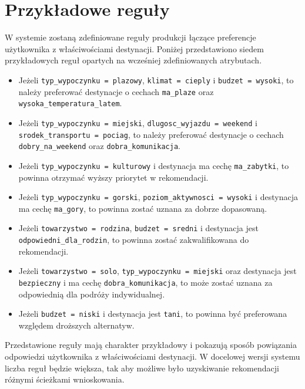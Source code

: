 \documentclass[12pt,a4paper]{article}
\begin{document}
\section{Przykładowe reguły}

W systemie zostaną zdefiniowane reguły produkcji łączące preferencje użytkownika z właściwościami destynacji. Poniżej przedstawiono siedem przykładowych reguł opartych na wcześniej zdefiniowanych atrybutach.

\begin{itemize}
    \item Jeżeli \texttt{typ\_wypoczynku = plazowy}, \texttt{klimat = cieply} i \texttt{budzet = wysoki}, to należy preferować destynacje o cechach \texttt{ma\_plaze} oraz \texttt{wysoka\_temperatura\_latem}.

    \item Jeżeli \texttt{typ\_wypoczynku = miejski}, \texttt{dlugosc\_wyjazdu = weekend} i \texttt{srodek\_transportu = pociag}, to należy preferować destynacje o cechach \texttt{dobry\_na\_weekend} oraz \texttt{dobra\_komunikacja}.

    \item Jeżeli \texttt{typ\_wypoczynku = kulturowy} i destynacja ma cechę \texttt{ma\_zabytki}, to powinna otrzymać wyższy priorytet w rekomendacji.

    \item Jeżeli \texttt{typ\_wypoczynku = gorski}, \texttt{poziom\_aktywnosci = wysoki} i destynacja ma cechę \texttt{ma\_gory}, to powinna zostać uznana za dobrze dopasowaną.

    \item Jeżeli \texttt{towarzystwo = rodzina}, \texttt{budzet = sredni} i destynacja jest \texttt{odpowiedni\_dla\_rodzin}, to powinna zostać zakwalifikowana do rekomendacji.

    \item Jeżeli \texttt{towarzystwo = solo}, \texttt{typ\_wypoczynku = miejski} oraz destynacja jest \texttt{bezpieczny} i ma cechę \texttt{dobra\_komunikacja}, to może zostać uznana za odpowiednią dla podróży indywidualnej.

    \item Jeżeli \texttt{budzet = niski} i destynacja jest \texttt{tani}, to powinna być preferowana względem droższych alternatyw.
\end{itemize}

Przedstawione reguły mają charakter przykładowy i pokazują sposób powiązania odpowiedzi użytkownika z właściwościami destynacji. W docelowej wersji systemu liczba reguł będzie większa, tak aby możliwe było uzyskiwanie rekomendacji różnymi ścieżkami wnioskowania.
\end{document}
